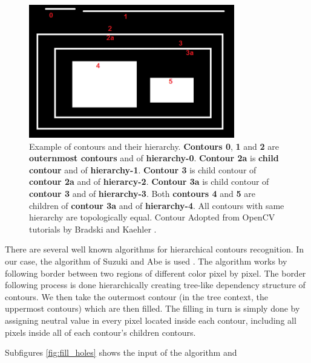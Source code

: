 \documentclass[pdftex,12pt,a4paper]{report}
\begin{document}
\begin{figure}[H]
\centering
\includegraphics[width=0.8\textwidth]{images/contours}
\caption{Example of contours and their hierarchy. \textbf{Contours 0}, \textbf{1} and \textbf{2} are \textbf{outernmost contours} and of \textbf{hierarchy-0}. \textbf{Contour 2a} is \textbf{child contour} and of \textbf{hierarchy-1}. \textbf{Contour 3} is child contour of \textbf{contour 2a} and of \textbf{hierarcy-2}. \textbf{Contour 3a} is child contour of  \textbf{contour 3} and of \textbf{hierarchy-3}. Both \textbf{contours 4} and \textbf{5} are children of \textbf{contour 3a} and of \textbf{hierarchy-4}. All contours with same hierarchy are topologically equal. Contour Adopted from OpenCV tutorials by Bradski and Kaehler \cite{bradski2008learning}.}
\label{fig:contours}
\end{figure}

There are several well known algorithms for hierarchical contours recognition. In our case, the algorithm of Suzuki and Abe is used \cite{suzuki1985topological}. The algorithm works by following border between two regions of different color pixel by pixel. The border following process is done hierarchically creating tree-like dependency structure of contours. We then take the outermost contour (in the tree context, the uppermost contours) which are then filled. The filling in turn is simply done by assigning neutral value in every pixel located inside each contour, including all pixels inside all of each contour's children contours.

Subfigures \ref{fig:fill_holes} shows the input of the algorithm and 
\end{document}
